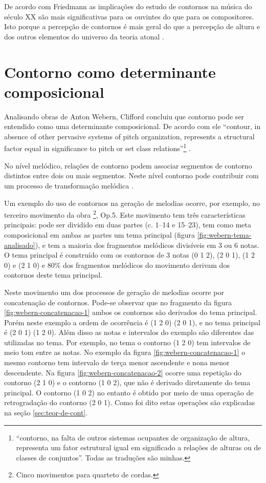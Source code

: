 De acordo com Friedmann as implicações do estudo de contornos na
música do século XX são mais significativas para os ouvintes do que
para os compositores. Isto porque a percepção de contornos é mais
geral do que a percepção de altura e dos outros elementos do universo
da teoria atonal \cite[p. 224]{friedmann85:methodology}. 

\section{Contorno como determinante composicional}
\label{sec:cont-como-determ}

Analisando obras de Anton Webern, Clifford concluiu que contorno pode
ser entendido como uma determinante composicional. De acordo com ele
``contour, in absence of other pervasive systems of pitch
organization, represents a structural factor equal in significance to
pitch or set class relations''\footnote{``contorno, na falta de outros
  sistemas ocupantes de organização de altura, representa um fator
  estrutural igual em significado a relações de alturas ou de classes
  de conjuntos''. Todas as traduções são
  minhas.} \cite[p. 157]{clifford95:contour}.

No nível melódico, relações de contorno podem associar segmentos de
contorno distintos entre dois ou mais segmentos. Neste nível contorno
pode contribuir com um processo de transformação melódica
\cite[p. 159]{clifford95:contour}.

Um exemplo do uso de contornos na geração de melodias ocorre, por
exemplo, no terceiro movimento da obra \footnote{Cinco movimentos para quarteto de
  cordas.}, Op.5. Este movimento tem três características principais:
pode ser dividido em duas partes (c. 1--14 e 15--23), tem como meta
composicional em ambas as partes um tema principal (figura
\ref{fig:webern-tema-analisado}), e tem a maioria dos fragmentos
melódicos divisíveis em 3 ou 6 notas. O tema principal é construído
com os contornos de 3 notas (0 1 2), (2 0 1), (1 2 0) e (2 1 0) e 80\%
dos fragmentos melódicos do movimento derivam dos contornos deste tema
principal.

Neste movimento um dos processos de geração de melodias ocorre por
concatenação de contornos. Pode-se observar que no fragmento da figura
\ref{fig:webern-concatenacao-1} ambos os contornos são derivados do
tema principal. Porém neste exemplo a ordem de ocorrência é (1 2 0) (2
0 1), e no tema principal é (2 0 1) (1 2 0). Além disso as notas e
intervalos do exemplo são diferentes das utilizadas no tema. Por
exemplo, no tema o contorno (1 2 0) tem intervalos de meio tom entre
as notas. No exemplo da figura \ref{fig:webern-concatenacao-1} o mesmo
contorno tem intervalo de terça menor ascendente e nona menor
descendente. Na figura \ref{fig:webern-concatenacao-2} ocorre uma
repetição do contorno (2 1 0) e o contorno (1 0 2), que não é derivado
diretamente do tema principal. O contorno (1 0 2) no entanto é obtido
por meio de uma operação de retrogradação do contorno (2 0 1). Como
foi dito estas operações são explicadas na seção
\ref{sec:teor-de-cont}.

